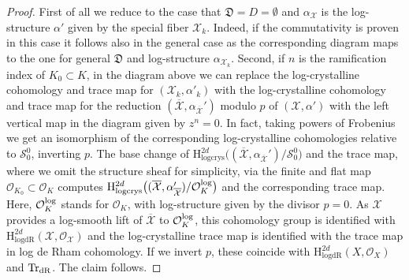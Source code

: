\documentclass[asterisque,english]{smfart}
\newtheorem{remark}[theo]{Remark}
\begin{document}
\begin{proof} First of all we reduce to the case that $\mathfrak{D}=D=\emptyset$ and $\alpha _{\mathcal{X}}$ is the log-structure $\alpha'$ given by the special fiber $\mathcal{X}_k$. Indeed, if the commutativity is proven in this case it follows also in the general case as the corresponding diagram maps to the one for general $\mathfrak{D}$   and log-structure $\alpha _{\mathcal{X}
_k}$. Second, if $n$ is the ramification index of $K_0\subset K$, in the diagram above we can replace the log-crystalline cohomology and trace map for $(\mathcal{X}_k,\alpha' _k)$ with the log-crystalline cohomology and trace map for the reduction $(\overline{\mathcal{X}}, \alpha_{\overline{\mathcal{X}}}')$ modulo $p$ of $(\mathcal{X},\alpha')$ with the left vertical map in the diagram given by $z^n=0$. In fact, taking powers of Frobenius we get an isomorphism of the corresponding log-crystalline cohomologies relative to $\mathcal{S}_{0}^{0}$, inverting $p$. The base change of $\mathrm{H}_{\mathrm{logcrys}}^{2d}\bigl((\overline{\mathcal{X}}, \alpha_{\overline{\mathcal{X}}}') /\mathcal{S}_{0}^{0}\bigr)$ and the trace map, where we omit the structure sheaf for simplicity, via the finite and flat map $\mathcal{O}_{K_0}\subset \mathcal{O}_K$ computes $\mathrm{H}_{\mathrm{logcrys}}^{2d}\bigl((\overline{\mathcal{X}}, \alpha_{\overline{\mathcal{X}}}')/\mathcal{O}_K^{\rm log}\bigr) $ and the corresponding trace map. Here, $\mathcal{O}_K^{\rm log}$ stands for $\mathcal{O}_K$, with log-structure given by the divisor $p=0$. As $\mathcal{X}$ provides a log-smooth lift of $\overline{\mathcal{X}}$  to $\mathcal{O}_K^{\rm log}$, this cohomology group is identified with $\mathrm{H}_{\mathrm{logdR
}}^{2d}( \mathcal{X},\mathcal{O}_{\mathcal{X}}) $ and the log-crystalline trace map is identified with the trace map in log de Rham cohomology. If we invert $p$, these coincide with  $\mathrm{H}_{\mathrm{logdR
}}^{2d}\left( X,\mathcal{O}_X \right)$ and $\mathrm{Tr}_{\rm dR}$. The  claim follows.
\end{proof}

%
\end{document}
